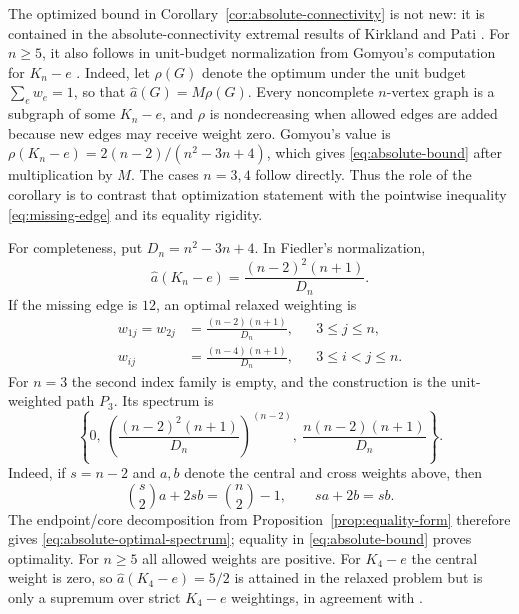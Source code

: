 \documentclass[11pt,reqno]{amsart}
\theoremstyle{definition}
\theoremstyle{remark}
\begin{document}
The optimized bound in Corollary~\ref{cor:absolute-connectivity} is not
new: it is contained in the absolute-connectivity extremal results of
Kirkland and Pati \cite{KirklandPati2002}.  For $n\ge5$, it also follows in
unit-budget normalization from Gomyou's computation for $K_n-e$
\cite[Proposition~3.7]{Gomyou2023}.  Indeed, let $\rho(G)$ denote
the optimum under the unit budget $\sum_e w_e=1$, so that
$\widehat a(G)=M\rho(G)$.  Every noncomplete $n$-vertex graph is a subgraph
of some $K_n-e$, and $\rho$ is nondecreasing when allowed edges are added
because new edges may receive weight zero.  Gomyou's value is
$\rho(K_n-e)=2(n-2)/(n^2-3n+4)$, which gives
\eqref{eq:absolute-bound} after multiplication by $M$.  The cases $n=3,4$
follow directly.  Thus the role of the corollary is to contrast that
optimization statement with the pointwise inequality
\eqref{eq:missing-edge} and its equality rigidity.

For completeness, put $D_n=n^2-3n+4$.  In Fiedler's normalization,
\begin{equation}\label{eq:absolute-kn-minus-edge}
  \widehat a(K_n-e)=\frac{(n-2)^2(n+1)}{D_n}.
\end{equation}
If the missing edge is $12$, an optimal relaxed weighting is
\begin{align}
  w_{1j}=w_{2j}
    &=\frac{(n-2)(n+1)}{D_n},
       &&3\le j\le n,\label{eq:absolute-cross-weights}\\
  w_{ij}
    &=\frac{(n-4)(n+1)}{D_n},
       &&3\le i<j\le n.\label{eq:absolute-central-weights}
\end{align}
For $n=3$ the second index family is empty, and the construction is the
unit-weighted path $P_3$.
Its spectrum is
\begin{equation}\label{eq:absolute-optimal-spectrum}
  \left\{
    0,\
    \left(\frac{(n-2)^2(n+1)}{D_n}\right)^{(n-2)},\
    \frac{n(n-2)(n+1)}{D_n}
  \right\}.
\end{equation}
Indeed, if $s=n-2$ and $a,b$ denote the central and cross weights above, then
\[
  \binom{s}{2}a+2sb=\binom n2-1,
  \qquad sa+2b=sb.
\]
The endpoint/core decomposition from Proposition~\ref{prop:equality-form}
therefore gives \eqref{eq:absolute-optimal-spectrum}; equality in
\eqref{eq:absolute-bound} proves optimality.
For $n\ge5$ all allowed weights are positive.  For $K_4-e$ the central
weight is zero, so $\widehat a(K_4-e)=5/2$ is attained in the relaxed problem
but is only a supremum over strict $K_4-e$ weightings, in agreement with
\cite[Section~6]{CFGL2026}.
\end{document}
